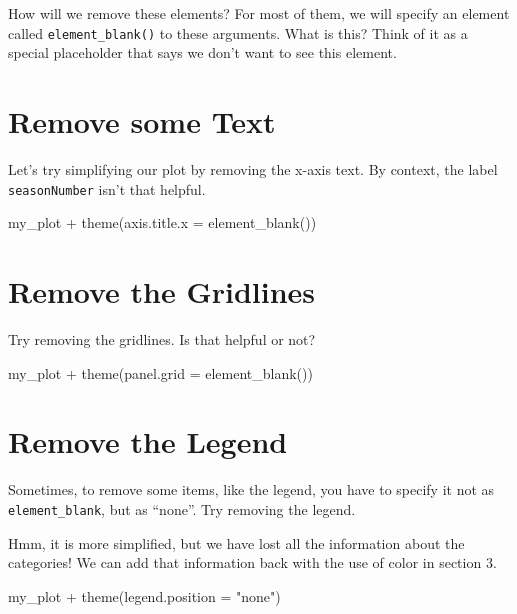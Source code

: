 \documentclass[
  letterpaper,
  DIV=11,
  numbers=noendperiod]{scrreprt}
\newenvironment{Shaded}{\begin{snugshade}}{\end{snugshade}}
\newcommand{\NormalTok}[1]{\textcolor[rgb]{0.00,0.23,0.31}{#1}}
\begin{document}
How will we remove these elements? For most of them, we will specify an
element called \texttt{element\_blank()} to these arguments. What is
this? Think of it as a special placeholder that says we don't want to
see this element.

\section{Remove some Text}\label{remove-some-text}

Let's try simplifying our plot by removing the x-axis text. By context,
the label \texttt{seasonNumber} isn't that helpful.

\begin{Shaded}
\begin{Highlighting}[]
\NormalTok{my\_plot + }
\NormalTok{  theme(axis.title.x = element\_blank())}
\end{Highlighting}
\end{Shaded}

\section{Remove the Gridlines}\label{remove-the-gridlines}

Try removing the gridlines. Is that helpful or not?

\begin{Shaded}
\begin{Highlighting}[]
\NormalTok{my\_plot + }
\NormalTok{  theme(panel.grid = element\_blank())}
\end{Highlighting}
\end{Shaded}

\section{Remove the Legend}\label{remove-the-legend}

Sometimes, to remove some items, like the legend, you have to specify it
not as \texttt{element\_blank}, but as ``none''. Try removing the
legend.

Hmm, it is more simplified, but we have lost all the information about
the categories! We can add that information back with the use of color
in section 3.

\begin{Shaded}
\begin{Highlighting}[]
\NormalTok{my\_plot + }
\NormalTok{  theme(legend.position = "none")}
\end{Highlighting}
\end{Shaded}
\end{document}
